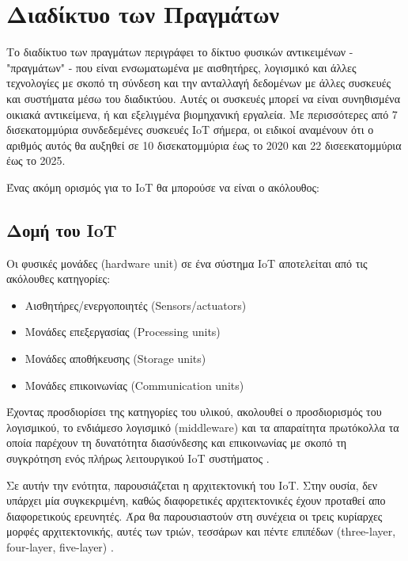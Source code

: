 \section{Διαδίκτυο των Πραγμάτων}
\label{sec:theory_iot}

Το διαδίκτυο των πραγμάτων περιγράφει το δίκτυο φυσικών αντικειμένων - "πραγμάτων" - που είναι ενσωματωμένα με αισθητήρες, λογισμικό και άλλες τεχνολογίες με σκοπό τη σύνδεση και την ανταλλαγή δεδομένων με άλλες συσκευές και συστήματα μέσω του διαδικτύου. Αυτές οι συσκευές μπορεί να είναι συνηθισμένα οικιακά αντικείμενα, ή και εξελιγμένα βιομηχανική εργαλεία. Με περισσότερες από 7 δισεκατομμύρια συνδεδεμένες συσκευές IoT σήμερα, οι ειδικοί αναμένουν ότι ο αριθμός αυτός θα αυξηθεί σε 10 δισεκατομμύρια έως το 2020 και 22 δισεεκατομμύρια έως το 2025.

Ένας ακόμη ορισμός για το IoT θα μπορούσε να είναι ο ακόλουθος:


\subsection{Δομή του IoT}
\label{subsec:structure}

Οι φυσικές μονάδες (hardware unit) σε ένα σύστημα IoT αποτελείται από τις ακόλουθες κατηγορίες:

\begin{itemize}
	\item Αισθητήρες/ενεργοποιητές (Sensors/actuators)
	\item Μονάδες επεξεργασίας (Processing units)
	\item Μονάδες αποθήκευσης (Storage units)
	\item Μονάδες επικοινωνίας (Communication units)
\end{itemize}

Έχοντας προσδιορίσει της κατηγορίες του υλικού, ακολουθεί ο προσδιορισμός του λογισμικού, το ενδιάμεσο λογισμικό (middleware) και τα απαραίτητα πρωτόκολλα τα οποία παρέχουν τη δυνατότητα διασύνδεσης και επικοινωνίας με σκοπό τη συγκρότηση ενός πλήρως λειτουργικού IoT συστήματος \cite{bib:chebudie_2014}.

Σε αυτήν την ενότητα, παρουσιάζεται η αρχιτεκτονική του IoT. Στην ουσία, δεν υπάρχει μία συγκεκριμένη, καθώς διαφορετικές αρχιτεκτονικές έχουν προταθεί απο διαφορετικούς ερευνητές. Άρα θα παρουσιαστούν στη συνέχεια οι τρεις κυρίαρχες μορφές αρχιτεκτονικής, αυτές των τριών, τεσσάρων και πέντε επιπέδων (three-layer, four-layer, five-layer) \cite{bib:sethi_2017}.

